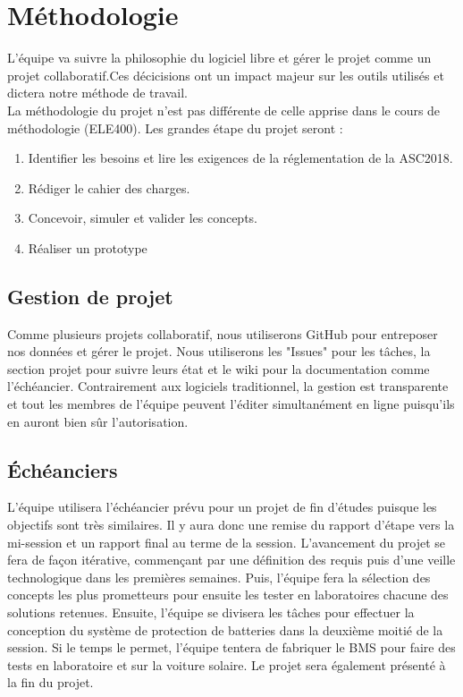 \section{Méthodologie}
L'équipe va suivre la philosophie du logiciel libre et gérer le projet comme un projet collaboratif.Ces décicisions 
ont un impact majeur sur les outils utilisés et dictera notre méthode de travail. \\
La méthodologie du projet n'est pas différente de celle apprise dans le cours de méthodologie (ELE400). Les grandes étape du projet seront : 
\begin{enumerate}
	\item Identifier les besoins et lire les exigences de la réglementation de la ASC2018.
	\item Rédiger le cahier des charges.
	\item Concevoir, simuler et valider les concepts.
	\item Réaliser un prototype
\end{enumerate}

\subsection{Gestion de projet}
Comme plusieurs projets collaboratif, nous utiliserons GitHub pour entreposer nos données et gérer le projet. Nous utiliserons les "Issues" pour les tâches, la section projet pour suivre leurs état et le wiki pour la documentation comme l'échéancier. Contrairement aux logiciels traditionnel, la gestion est transparente et tout les membres de l'équipe peuvent l'éditer simultanément en ligne puisqu'ils en auront bien sûr l'autorisation. 

\subsection{Échéanciers}
L'équipe utilisera l'échéancier prévu pour un projet de fin d'études puisque les objectifs sont très similaires. Il y aura donc une remise du rapport d'étape vers la mi-session et un rapport final au terme de la session. L'avancement du projet se fera de façon itérative, commençant par une définition des requis puis d'une veille technologique dans les premières semaines. Puis, l'équipe fera la sélection des concepts les plus prometteurs pour ensuite les tester en laboratoires chacune des solutions retenues. Ensuite, l'équipe se divisera les tâches pour effectuer la conception du système de protection de batteries dans la deuxième moitié de la session. Si le temps le permet, l'équipe tentera de fabriquer le BMS pour faire des tests en laboratoire et sur la voiture solaire. Le projet sera également présenté à la fin du projet.

